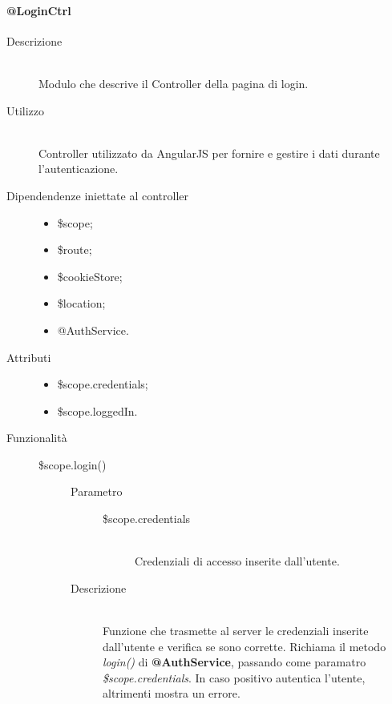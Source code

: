 \paragraph{@LoginCtrl}
\begin{description}
 \item[Descrizione] \hfill \\
 Modulo che descrive il Controller della pagina di login.
 
 \item[Utilizzo] \hfill \\
 Controller utilizzato da AngularJS per fornire e gestire i dati durante l'autenticazione.
 
 \item[Dipendendenze iniettate al controller] \hfill
 \begin{itemize}
  \item \$scope;
  \item \$route;
  \item \$cookieStore;
  \item \$location;
  \item @AuthService.
  
 \end{itemize}
 
 \item[Attributi] \hfill
 \begin{itemize}
 \item \$scope.credentials;
 \item \$scope.loggedIn.
 \end{itemize}
 
 \item[Funzionalità] \hfill
 \begin{description}
  \item[\$scope.login()] \hfill
  \begin{description}
  	\item[Parametro] \hfill
  	\begin{description}
  		\item[\$scope.credentials] \hfill \\
  		Credenziali di accesso inserite dall'utente.
  	\end{description}
  	\item[Descrizione] \hfill \\
  	Funzione che trasmette al server le credenziali inserite dall'utente e verifica se sono corrette. Richiama il metodo \textit{login()} di \textbf{@AuthService}, passando come paramatro \textit{\$scope.credentials}.
  	In caso positivo autentica l'utente, altrimenti mostra un errore.
  \end{description}
 \end{description}
\end{description}

